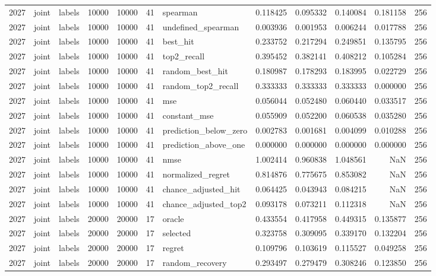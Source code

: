 \begin{tabular}{rllrrrlrrrrr}
2027 & joint & labels & 10000 & 10000 & 41 & spearman & 0.118425 & 0.095332 & 0.140084 & 0.181158 & 256 \\
2027 & joint & labels & 10000 & 10000 & 41 & undefined_spearman & 0.003936 & 0.001953 & 0.006244 & 0.017788 & 256 \\
2027 & joint & labels & 10000 & 10000 & 41 & best_hit & 0.233752 & 0.217294 & 0.249851 & 0.135795 & 256 \\
2027 & joint & labels & 10000 & 10000 & 41 & top2_recall & 0.395452 & 0.382141 & 0.408212 & 0.105284 & 256 \\
2027 & joint & labels & 10000 & 10000 & 41 & random_best_hit & 0.180987 & 0.178293 & 0.183995 & 0.022729 & 256 \\
2027 & joint & labels & 10000 & 10000 & 41 & random_top2_recall & 0.333333 & 0.333333 & 0.333333 & 0.000000 & 256 \\
2027 & joint & labels & 10000 & 10000 & 41 & mse & 0.056044 & 0.052480 & 0.060440 & 0.033517 & 256 \\
2027 & joint & labels & 10000 & 10000 & 41 & constant_mse & 0.055909 & 0.052200 & 0.060538 & 0.035280 & 256 \\
2027 & joint & labels & 10000 & 10000 & 41 & prediction_below_zero & 0.002783 & 0.001681 & 0.004099 & 0.010288 & 256 \\
2027 & joint & labels & 10000 & 10000 & 41 & prediction_above_one & 0.000000 & 0.000000 & 0.000000 & 0.000000 & 256 \\
2027 & joint & labels & 10000 & 10000 & 41 & nmse & 1.002414 & 0.960838 & 1.048561 & NaN & 256 \\
2027 & joint & labels & 10000 & 10000 & 41 & normalized_regret & 0.814876 & 0.775675 & 0.853082 & NaN & 256 \\
2027 & joint & labels & 10000 & 10000 & 41 & chance_adjusted_hit & 0.064425 & 0.043943 & 0.084215 & NaN & 256 \\
2027 & joint & labels & 10000 & 10000 & 41 & chance_adjusted_top2 & 0.093178 & 0.073211 & 0.112318 & NaN & 256 \\
2027 & joint & labels & 20000 & 20000 & 17 & oracle & 0.433554 & 0.417958 & 0.449315 & 0.135877 & 256 \\
2027 & joint & labels & 20000 & 20000 & 17 & selected & 0.323758 & 0.309095 & 0.339170 & 0.132204 & 256 \\
2027 & joint & labels & 20000 & 20000 & 17 & regret & 0.109796 & 0.103619 & 0.115527 & 0.049258 & 256 \\
2027 & joint & labels & 20000 & 20000 & 17 & random_recovery & 0.293497 & 0.279479 & 0.308246 & 0.123850 & 256 \\

\end{tabular}
